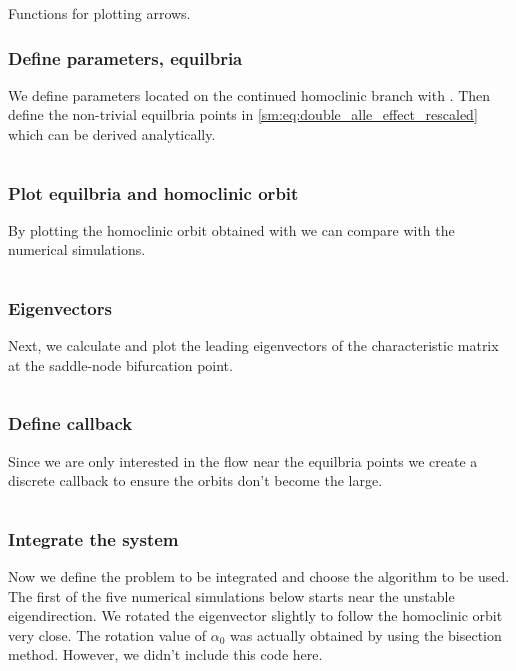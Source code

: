 \begin{code}
\inputminted[firstline=40, lastline=71]{julia}{\pathToJuliaFiles/predator_prey_simulation_article.jl}
\caption{Functions for plotting arrows.}
\label{sm:lst:arrow_fucntions}
\end{code}

\subsubsection{Define parameters, equilbria}
We define parameters located on the continued homoclinic branch with
\DDEBIFTOOL. Then define the non-trivial equilbria points in
\cref{sm:eq:double_alle_effect_rescaled} which can be derived analytically.
\inputminted[firstline=73, lastline=80]{julia}{\pathToJuliaFiles/predator_prey_simulation_article.jl}

\subsubsection{Plot equilbria and homoclinic orbit}
By plotting the homoclinic orbit obtained with \DDEBIFTOOL we can compare with the numerical simulations. 
\inputminted[firstline=82, lastline=91]{julia}{\pathToJuliaFiles/predator_prey_simulation_article.jl}

\subsubsection{Eigenvectors}
Next, we calculate and plot the leading eigenvectors of the characteristic matrix at the saddle-node bifurcation point.
\inputminted[firstline=93, lastline=105]{julia}{\pathToJuliaFiles/predator_prey_simulation_article.jl}

\subsubsection{Define callback}
Since we are only interested in the flow near the equilbria points we create a
discrete callback to ensure the orbits don't become the large.
\inputminted[firstline=107, lastline=110]{julia}{\pathToJuliaFiles/predator_prey_simulation_article.jl}

\subsubsection{Integrate the system}
Now we define the problem to be integrated and choose the algorithm to be used.
The first of the five numerical simulations below starts near the unstable
eigendirection. We rotated the eigenvector slightly to follow the homoclinic
orbit very close. The rotation value of $\alpha_0$ was actually obtained by using
the bisection method. However, we didn't include this code here. 
\inputminted[firstline=112, lastline=147]{julia}{\pathToJuliaFiles/predator_prey_simulation_article.jl}

